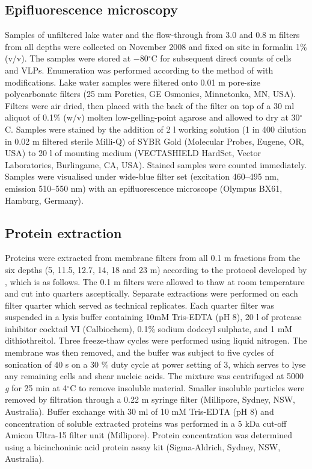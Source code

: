 \subsection{Epifluorescence microscopy}
Samples of unfiltered lake water and the flow-through from 3.0 and 0.8 \textmu{}m filters from all depths were collected on November 2008 and fixed on site in formalin 1\% (v/v). 
The samples were stored at $-$80$^{\circ}$C for subsequent direct counts of cells and \acp{VLP}. 
Enumeration was performed according to the method of \citet{Patel2007} with modifications. 
Lake water samples were filtered onto 0.01 \textmu{}m pore-size polycarbonate filters (25 mm Poretics, \textsc{GE} Osmonics, Minnetonka, \textsc{MN}, \textsc{USA}). 
Filters were air dried, then placed with the back of the filter on top of a 30 ml aliquot of 0.1\% (w/v) molten low-gelling-point agarose and allowed to dry at 30$^{\circ}$C. 
Samples were stained by the addition of 2 \textmu{}l working solution (1 in 400 dilution in 0.02 \textmu{}m filtered sterile Milli-Q) of \textsc{SYBR} Gold (Molecular Probes, Eugene, \textsc{OR}, \textsc{USA}) to 20 \textmu{}l of mounting medium (\textsc{VECTASHIELD} HardSet, Vector Laboratories, Burlingame, \textsc{CA}, \textsc{USA}). 
Stained samples were counted immediately.
Samples were visualised under wide-blue filter set (excitation 460--495 nm, emission 510--550 nm) with an epifluorescence microscope (Olympus BX61, Hamburg, Germany).


\subsection{Protein extraction}
Proteins were extracted from membrane filters from all 0.1 \textmu{}m fractions from the six depths (5, 11.5, 12.7, 14, 18 and 23 m) according to the protocol developed by \citet{Ng2010a}, which is as follows.
The 0.1 \textmu{}m filters were allowed to thaw at room temperature and cut into quarters asceptically.
Separate extractions were performed on each filter quarter which served as technical replicates.
Each quarter filter was suspended in a lysis buffer containing 10mM Tris-EDTA (pH 8), 20 \textmu{}l of protease inhibitor cocktail VI (Calbiochem), 0.1\% sodium dodecyl sulphate, and 1 mM dithiothreitol.
Three freeze-thaw cycles were performed using liquid nitrogen.
The membrane was then removed, and the buffer was subject to five cycles of sonication of 40 s on a 30 \% duty cycle at power setting of 3, which serves to lyse any remaining cells and shear nucleic acids.
The mixture was centrifuged at 5000 \emph{g} for 25 min at 4$^{\circ}$C to remove insoluble material.
Smaller insoluble particles were removed by filtration through a 0.22 \textmu{}m syringe filter (Millipore, Sydney, NSW, Australia).
Buffer exchange with 30 ml of 10 mM Tris-EDTA (pH 8) and concentration of soluble extracted proteins was performed in a 5 kDa cut-off Amicon Ultra-15 filter unit (Millipore).
Protein concentration was determined using a bicinchoninic acid protein assay kit (Sigma-Aldrich, Sydney, NSW, Australia).

